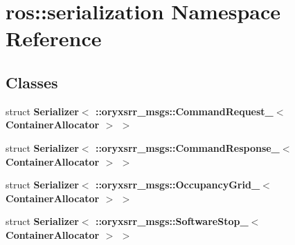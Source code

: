\section{ros\-:\-:serialization \-Namespace \-Reference}
\label{namespaceros_1_1serialization}
\subsection*{\-Classes}
\begin{DoxyCompactItemize}
\item 
struct {\bf \-Serializer$<$ \-::oryxsrr\-\_\-msgs\-::\-Command\-Request\-\_\-$<$ Container\-Allocator $>$ $>$}
\item 
struct {\bf \-Serializer$<$ \-::oryxsrr\-\_\-msgs\-::\-Command\-Response\-\_\-$<$ Container\-Allocator $>$ $>$}
\item 
struct {\bf \-Serializer$<$ \-::oryxsrr\-\_\-msgs\-::\-Occupancy\-Grid\-\_\-$<$ Container\-Allocator $>$ $>$}
\item 
struct {\bf \-Serializer$<$ \-::oryxsrr\-\_\-msgs\-::\-Software\-Stop\-\_\-$<$ Container\-Allocator $>$ $>$}
\end{DoxyCompactItemize}
